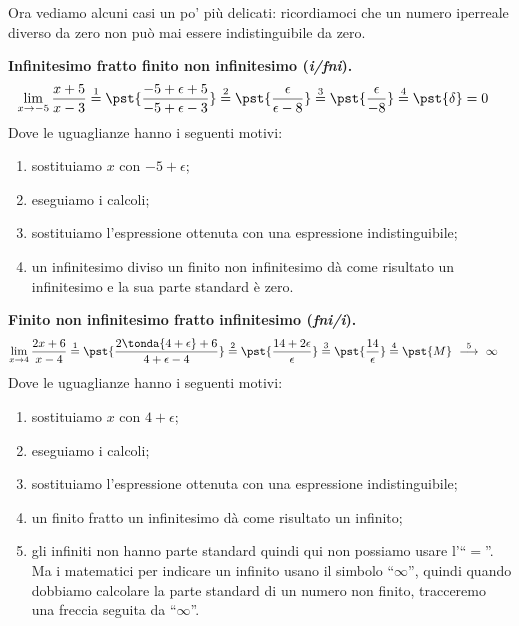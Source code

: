 Ora vediamo alcuni casi un po' più delicati: ricordiamoci che un numero 
iperreale diverso da zero non può mai essere indistinguibile da zero.

\begin{esempio}
\textbf{Infinitesimo fratto finito non infinitesimo (\emph{i/fni}).}
\begin{align*}
\lim_{x \rightarrow -5} \frac{x+5}{x-3} & \stackrel{1}{=} 
  \pst{\frac{-5+\epsilon+5}{-5+\epsilon-3}} \stackrel{2}{=}  
  \pst{\frac{\epsilon}{\epsilon-8}} \stackrel{3}{=} 
  \pst{\frac{\epsilon}{-8}} \stackrel{4}{=} \pst{\delta} = 0
\end{align*}
Dove le uguaglianze hanno i seguenti motivi:
\begin{enumerate} [nosep]
 \item sostituiamo \(x\) con \(-5+\epsilon\);
 \item eseguiamo i calcoli;
 \item sostituiamo l'espressione ottenuta con una espressione 
   indistinguibile;
 \item un infinitesimo diviso un finito non infinitesimo dà come risultato 
un infinitesimo e la sua parte standard è zero.
\end{enumerate}
\end{esempio}

\begin{esempio}
\textbf{Finito non infinitesimo fratto infinitesimo (\emph{fni/i}).}
\begin{align*}
\lim_{x \rightarrow 4} \frac{2x+6}{x-4} & \stackrel{1}{=} 
  \pst{\frac{2\tonda{4+\epsilon}+6}{4+\epsilon-4}} \stackrel{2}{=}  
  \pst{\frac{14 + 2 \epsilon}{\epsilon}} \stackrel{3}{=} 
  \pst{\frac{14}{\epsilon}} \stackrel{4}{=} 
  \pst{M} \stackrel{5}{~\longrightarrow~} \infty
\end{align*}
Dove le uguaglianze hanno i seguenti motivi:
\begin{enumerate} [nosep]
 \item sostituiamo \(x\) con \(4+\epsilon\);
 \item eseguiamo i calcoli;
 \item sostituiamo l'espressione ottenuta con una espressione 
   indistinguibile;
 \item un finito fratto un infinitesimo dà come risultato un infinito; 
 \item gli infiniti non hanno parte standard quindi qui non possiamo usare 
l'``\(=\)''. Ma i matematici per indicare un infinito usano il simbolo 
``\(\infty\)'', quindi quando dobbiamo calcolare la parte standard di un 
numero non finito, tracceremo una freccia seguita da ``\(\infty\)''.
\end{enumerate}
\end{esempio}

